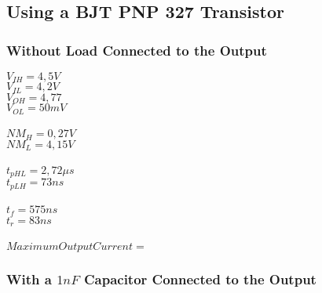 \documentclass[a4paper,11pt]{report}
\begin{document}
\subsection{\color{purple}Using a BJT PNP 327 Transistor}

\subsubsection{\color{red}Without Load Connected to the Output}
$V_{IH} = 4,5V$\\
$V_{IL} = 4,2V$\\
$V_{OH} =4,77 $\\
$V_{OL} = 50mV $\\ \\
$NM_{H} = 0,27V$\\   %
$NM_{L} = 4,15V$\\ \\ %
$t_{pHL} = 2,72\mu s$\\
$t_{pLH} = 73ns$\\ \\
$t_{f} = 575ns$\\
$t_{r} = 83ns$\\ \\
$Maximum Output Current = $ %
\subsubsection{\color{red}With a $1 nF$ Capacitor Connected to the Output}
\end{document}
